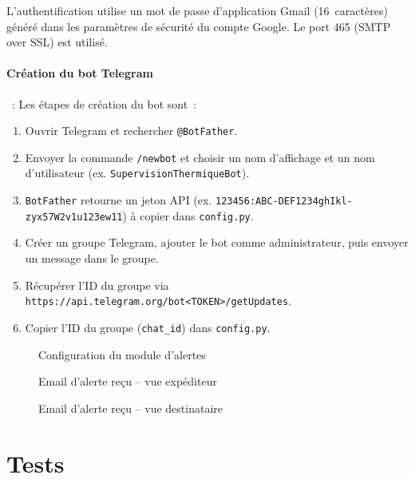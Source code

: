 L'authentification utilise un mot de passe d'application Gmail (16~caractères) généré dans les paramètres de sécurité du compte Google. Le port 465 (SMTP over SSL) est utilisé.

\paragraph{Création du bot Telegram}~: Les étapes de création du bot sont~:
\begin{enumerate}
  \item Ouvrir Telegram et rechercher \texttt{@BotFather}.
  \item Envoyer la commande \texttt{/newbot} et choisir un nom d'affichage et un nom d'utilisateur (ex. \texttt{SupervisionThermiqueBot}).
  \item \texttt{BotFather} retourne un jeton API (ex. \texttt{123456:ABC-DEF1234ghIkl-zyx57W2v1u123ew11}) à copier dans \texttt{config.py}.
  \item Créer un groupe Telegram, ajouter le bot comme administrateur, puis envoyer un message dans le groupe.
  \item Récupérer l'ID du groupe via \texttt{https://api.telegram.org/bot<TOKEN>/getUpdates}.
  \item Copier l'ID du groupe (\texttt{chat\_id}) dans \texttt{config.py}.
\end{enumerate}

\begin{figure}[htbp]
  \centering
  \caption{Configuration du module d'alertes}
  \label{fig:alert_config}
\end{figure}

\begin{figure}[htbp]
  \centering
  \caption{Email d'alerte reçu -- vue expéditeur}
  \label{fig:alert_email_sent}
\end{figure}

\begin{figure}[htbp]
  \centering
  \caption{Email d'alerte reçu -- vue destinataire}
  \label{fig:alert_email_received}
\end{figure}

\section{Tests}

